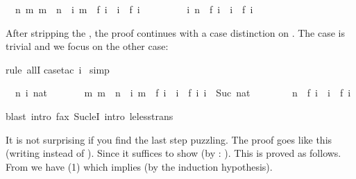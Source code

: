 \begin{isabellebody}
\begin{isamarkuptxt}
\begin{isabelle}
\ {}{\isachardot}\ {\isasymAnd}n{\isachardot}\ {\isasymforall}m{\isachardot}\ m\ {\isacharless}\ n\ {\isasymlongrightarrow}\ {\isacharparenleft}{\isasymforall}i{\isachardot}\ m\ {\isacharequal}\ f\ i\ {\isasymlongrightarrow}\ i\ {\isasymle}\ f\ i{\isacharparenright}\ {\isasymLongrightarrow}\isanewline
\ \ \ \ \ \ \ \ {\isasymforall}i{\isachardot}\ n\ {\isacharequal}\ f\ i\ {\isasymlongrightarrow}\ i\ {\isasymle}\ f\ i%
\end{isabelle}
After stripping the , the proof continues with a case
distinction on . The case  is trivial and we focus on
the other case:%
\end{isamarkuptxt}%
rule\ allI{\isacharparenright}\isanewline
{}case{\isacharunderscore}tac\ i{\isacharparenright}\isanewline
\ simp{\isacharparenright}%
\begin{isamarkuptxt}%
\begin{isabelle}%
\ {}{\isachardot}\ {\isasymAnd}n\ i\ nat{\isachardot}\isanewline
\ \ \ \ \ \ \ {\isasymlbrakk}{\isasymforall}m{\isachardot}\ m\ {\isacharless}\ n\ {\isasymlongrightarrow}\ {\isacharparenleft}{\isasymforall}i{\isachardot}\ m\ {\isacharequal}\ f\ i\ {\isasymlongrightarrow}\ i\ {\isasymle}\ f\ i{\isacharparenright}{\isacharsemicolon}\ i\ {\isacharequal}\ Suc\ nat{\isasymrbrakk}\isanewline
\ \ \ \ \ \ \ {\isasymLongrightarrow}\ n\ {\isacharequal}\ f\ i\ {\isasymlongrightarrow}\ i\ {\isasymle}\ f\ i%
\end{isabelle}%
\end{isamarkuptxt}%
blast\ intro{\isacharbang}{\isacharcolon}\ f{\isacharunderscore}ax\ Suc{\isacharunderscore}leI\ intro{\isacharcolon}\ le{\isacharunderscore}less{\isacharunderscore}trans{\isacharparenright}%
\begin{isamarkuptext}%
\noindent
It is not surprising if you find the last step puzzling.
The proof goes like this (writing  instead of ).
Since  it suffices to show
 (by : ). This is
proved as follows. From  we have 
(1) which implies  (by the induction hypothesis).

\end{isamarkuptext}
\end{isabellebody}
